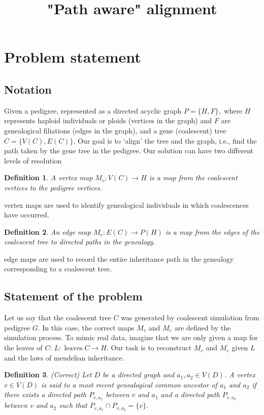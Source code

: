 \documentclass[14pt]{extarticle}
\newtheorem{definition}{Definition}
\begin{document}
	
	
\title{"Path aware" alignment}
\date{}


\section{Problem statement}

\subsection{Notation}

Given a pedigree, represented as a directed acyclic graph $P = \{H, F\},$ where $H$ represents haploid individuals or ploids (vertices in the graph) and $F$ are genealogical filiations (edges in the graph), and a gene (coalescent) tree $C = \{V(C), E(C)\}.$ Our goal is to `align' the tree and the graph, i.e., find the path taken by the gene tree in the pedigree. Our solution can have two different levels of resolution


\begin{definition}
A vertex map $M_v:V(C) \rightarrow H$ is a map from the coalescent vertices to the pedigree vertices.   
\end{definition}
vertex maps are used to identify genealogical individuals in which coalescences have occurred. 

\begin{definition}
An edge map $M_e:E(C) \rightarrow P(H)$ is a map from the edges of the coalescent tree to directed paths in the genealogy.    
\end{definition}
edge maps are used to record the entire inheritance path in the genealogy corresponding to a coalescent tree.  



\subsection{Statement of the problem} 

Let us say that the coalescent tree $C$ was generated by coalescent simulation from pedigree $G$. In this case, the correct maps $M_v$ and $M_e$ are defined by the simulation process. To mimic real data, imagine that we are only  given a map for the leaves of $C$: $L: \operatorname{leaves}{C} \rightarrow H.$ Our task is to reconstruct $M_v$ and $M_e$ given $L$ and the laws of mendelian inheritance.  

\begin{definition} (Correct)
	Let $D$ be a directed graph and $a_1, a_2 \in V(D)$. A vertex $v \in V(D)$ is said to a most recent genealogical common ancestor of $a_1$ and $a_2$ if there exists 
	a directed path $P_{v,a_1}$ between $v$ and $a_1$ and a directed path $P_{v,a_2}$ between $v$ and $a_2$ such that $P_{v,a_1} \cap P_{v,a_2} = \{v\}.$	
\end{definition}
\end{document}
